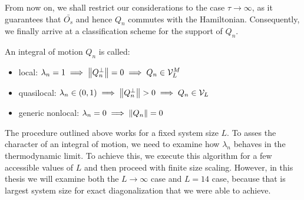 From now on, we shall restrict our considerations to the case \(\tau \to \infty \), 
as it guarantees that \(\bar{O_s}\) and hence \(Q_n\) commutes with the Hamiltonian. 
Consequently, we finally arrive at a classification scheme for the support of \(Q_n\).
\begin{definition}
  An integral of motion \(Q_n\) is called:
  \begin{itemize}
    \item local: \(\lambda_n = 1 \implies \norm{Q_n^{\perp}} = 0 \implies Q_n \in \mathcal{V}^M_L\)
    \item quasilocal: \(\lambda_n \in \left(0,1\right) \implies \norm{Q_n^{\perp}} > 0 \implies Q_n \in \mathcal{V}_L \)
    \item generic nonlocal: \(\lambda_n = 0 \implies \norm{Q_n} = 0\)
  \end{itemize}
  \label{def:classification}
\end{definition}
The procedure outlined above works for a fixed system size \(L\).
To asses the character of an integral of motion, we need to examine how \(\lambda_n\) 
behaves in the thermodynamic limit. To achieve this, we execute this algorithm for a 
few accessible values of \(L\) and then proceed with finite size scaling.
However, in this thesis we will examine both the \(L\to \infty \) case and \(L = 14\)
case, because that is largest system size for exact diagonalization that we were able to achieve.

